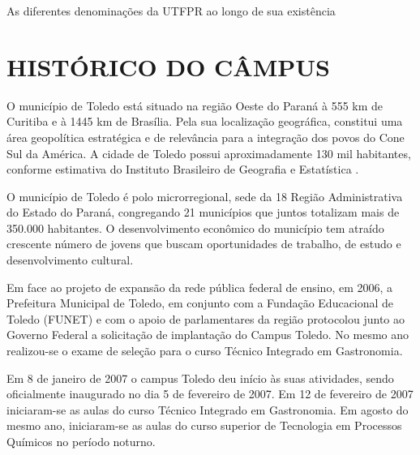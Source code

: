    \begin{quadro}
        \centering
        \caption[Diferentes denominações da UTFPR]{As diferentes denominações da UTFPR ao longo de sua existência}
        \label{qua:denomi}
    \end{quadro}

\section{HISTÓRICO DO CÂMPUS}

O município de Toledo está situado na região Oeste do Paraná à 555 km de Curitiba e à 1445 km de Brasília. Pela sua localização geográfica, constitui uma área geopolítica estratégica e de relevância para a integração dos povos do Cone Sul da América. A cidade de Toledo possui aproximadamente 130 mil habitantes, conforme estimativa do Instituto Brasileiro de Geografia e Estatística \cite{ibge2020}.


O município de Toledo é polo microrregional, sede da 18\textordfeminine{} Região Administrativa do Estado do Paraná, congregando 21 municípios que juntos totalizam mais de 350.000 habitantes. O desenvolvimento econômico do município tem atraído crescente número de jovens que buscam oportunidades de trabalho, de estudo e desenvolvimento cultural.

Em face ao projeto de expansão da rede pública federal de ensino, em 2006, a Prefeitura Municipal de Toledo, em conjunto com a Fundação Educacional de Toledo (FUNET) e com o apoio de parlamentares da região protocolou junto ao Governo Federal a solicitação de implantação do Campus Toledo. No mesmo ano realizou-se o exame de seleção para o curso Técnico Integrado em Gastronomia.


Em 8 de janeiro de 2007 o campus Toledo deu início às suas atividades, sendo oficialmente inaugurado no dia 5 de fevereiro de 2007. Em 12 de fevereiro de 2007 iniciaram-se as aulas do curso Técnico Integrado em Gastronomia. Em agosto do mesmo ano, iniciaram-se as aulas do curso superior de Tecnologia em Processos Químicos no período noturno.

